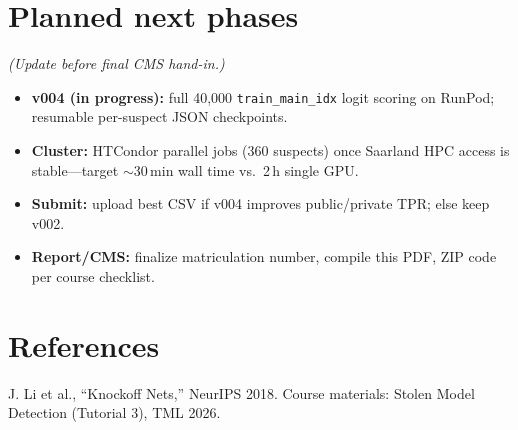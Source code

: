 \documentclass[10pt,twocolumn]{article}
\begin{document}
\section{Planned next phases}
\textit{(Update before final CMS hand-in.)}
\begin{itemize}
  \item \textbf{v004 (in progress):} full 40{,}000 \texttt{train\_main\_idx} logit scoring on RunPod; resumable per-suspect JSON checkpoints.
  \item \textbf{Cluster:} HTCondor parallel jobs (360 suspects) once Saarland HPC access is stable---target $\sim$30\,min wall time vs.\ 2\,h single GPU.
  \item \textbf{Submit:} upload best CSV if v004 improves public/private TPR; else keep v002.
  \item \textbf{Report/CMS:} finalize matriculation number, compile this PDF, ZIP code per course checklist.
\end{itemize}

\section*{References}
\small
J. Li et al., ``Knockoff Nets,'' NeurIPS 2018.
Course materials: Stolen Model Detection (Tutorial 3), TML 2026.
\end{document}
